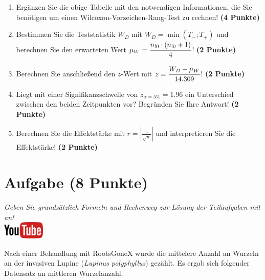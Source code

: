 \documentclass[a4paper, 9pt]{scrartcl}\usepackage[]{graphicx}\usepackage[]{xcolor}
\begin{document}
\begin{enumerate}
\item Erg{\"a}nzen Sie die obige Tabelle mit den notwendigen Informationen, die
  Sie ben{\"o}tigen um einen Wilcoxon-Vorzeichen-Rang-Test zu rechnen!
  \textbf{(4 Punkte)}
\item Bestimmen Sie die Teststatistik $W_D$ mit $W_D = \min(T_{-}; T_{+})$ und
  berechnen Sie den erwarteten Wert $\mu_W = \cfrac{n_{!0} \cdot (n_{!0} + 1)}{4}$!
  \textbf{(2 Punkte)}
\item Berechnen Sie anschlie{\ss}end den $z$-Wert mit $z = \cfrac{W_D -
    \mu_W}{14.309}$! \textbf{(2 Punkte)}
\item Liegt mit einer Signifikanzschwelle von $z_{\alpha = 5\%} =
  1.96$ ein Unterschied zwischen den beiden Zeitpunkten vor? Begr{\"u}nden Sie
  Ihre Antwort! \textbf{(2 Punkte)} 
\item Berechnen Sie die Effektst{\"a}rke mit $r = |\frac{z}{\sqrt{n}}| $ und
  interpretieren Sie die Effektst{\"a}rke! \textbf{(2 Punkte)} 
\end{enumerate} 
\clearpage

\section{Aufgabe \hfill (8 Punkte)}

\textit{Geben Sie grunds{\"a}tzlich Formeln und Rechenweg zur L{\"o}sung der
  Teilaufgaben mit an!} \\[1Ex]

\hfill\href{https://youtu.be/5tiJFxuZcco}{\includegraphics[width =
  2cm]{img/youtube}} %
\hspace{2Ex}




Nach einer Behandlung mit RootsGoneX wurde die mittelere Anzahl an Wurzeln
an der invasiven Lupine (\textit{Lupinus polyphyllus}) gez{\"a}hlt. Es ergab sich
folgender Datensatz an mittleren Wurzelanzahl.
\end{document}
